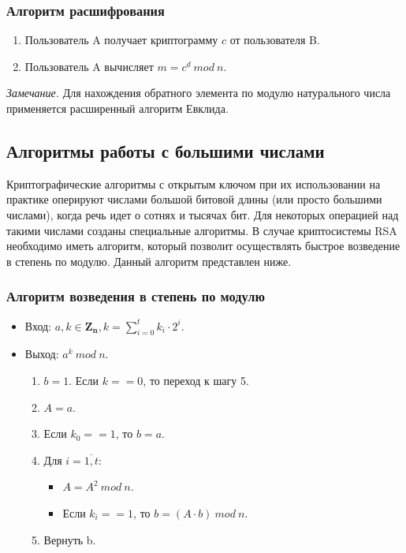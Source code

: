 \subsubsection*{Алгоритм расшифрования}
\begin{enumerate}
    \item Пользователь A получает криптограмму $c$ от пользователя B.
    \item Пользователь A вычисляет $m = c^d \ mod \ n$.
\end{enumerate}

\textit{Замечание.} Для нахождения обратного элемента по модулю натурального числа применяется расширенный алгоритм Евклида.

\subsection*{Алгоритмы работы с большими числами}
Криптографические алгоритмы с открытым ключом при их использовании на практике оперируют числами большой битовой длины (или просто большими числами), когда речь идет о сотнях и тысячах бит. Для некоторых операцией над такими числами созданы специальные алгоритмы. В случае криптосистемы RSA необходимо иметь алгоритм, который позволит осуществлять быстрое возведение в степень по модулю. Данный алгоритм представлен ниже.

\subsubsection*{Алгоритм возведения в степень по модулю}
\begin{itemize}
    \item Вход: $a, k \in \mathbf{Z_n}, k = \sum\limits_{i=0}^{t} k_i \cdot 2^i.$
    \item Выход: $a^k \ mod \ n.$
    \begin{enumerate}
        \item $b = 1$. Если $k == 0$, то переход к шагу 5.
        \item $A = a$.
        \item Если $k_0 == 1$, то $b = a$.
        \item Для $i = \overline{1, t}$:
        \begin{itemize}
            \item $A = A^2 \ mod \ n$.
            \item Если $k_i == 1$, то $b = (A \cdot b) \ mod \ n$.
        \end{itemize}
        \item Вернуть b.
    \end{enumerate}
\end{itemize}

